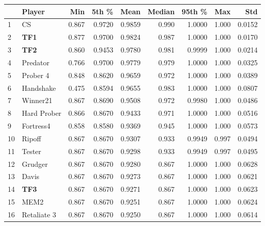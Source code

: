 \begin{tabular}{llrrrrrrr}
\toprule
{} &       Player &    Min &   5th \% &    Mean &  Median &  95th \% &    Max &     Std \\
\midrule
1  &           CS &  0.867 &  0.9720 &  0.9859 &   0.990 &  1.0000 &  1.000 &  0.0152 \\
2  &          \textbf{TF1} &  0.877 &  0.9700 &  0.9824 &   0.987 &  1.0000 &  1.000 &  0.0170 \\
3  &          \textbf{TF2} &  0.860 &  0.9453 &  0.9780 &   0.981 &  0.9999 &  1.000 &  0.0214 \\
4  &     Predator &  0.766 &  0.9700 &  0.9779 &   0.979 &  1.0000 &  1.000 &  0.0325 \\
5  &     Prober 4 &  0.848 &  0.8620 &  0.9659 &   0.972 &  1.0000 &  1.000 &  0.0389 \\
6  &    Handshake &  0.475 &  0.8594 &  0.9655 &   0.983 &  1.0000 &  1.000 &  0.0807 \\
7  &     Winner21 &  0.867 &  0.8690 &  0.9508 &   0.972 &  0.9980 &  1.000 &  0.0486 \\
8  &  Hard Prober &  0.866 &  0.8670 &  0.9433 &   0.971 &  1.0000 &  1.000 &  0.0516 \\
9  &    Fortress4 &  0.858 &  0.8580 &  0.9369 &   0.945 &  1.0000 &  1.000 &  0.0573 \\
10 &       Ripoff &  0.867 &  0.8670 &  0.9307 &   0.933 &  0.9949 &  0.997 &  0.0494 \\
11 &       Tester &  0.867 &  0.8670 &  0.9298 &   0.933 &  0.9949 &  0.997 &  0.0495 \\
12 &      Grudger &  0.867 &  0.8670 &  0.9280 &   0.867 &  1.0000 &  1.000 &  0.0628 \\
13 &        Davis &  0.867 &  0.8670 &  0.9273 &   0.867 &  1.0000 &  1.000 &  0.0621 \\
14 &          \textbf{TF3} &  0.867 &  0.8670 &  0.9271 &   0.867 &  1.0000 &  1.000 &  0.0623 \\
15 &         MEM2 &  0.867 &  0.8670 &  0.9251 &   0.867 &  1.0000 &  1.000 &  0.0624 \\
16 &  Retaliate 3 &  0.867 &  0.8670 &  0.9250 &   0.867 &  1.0000 &  1.000 &  0.0614 \\
\bottomrule
\end{tabular}
